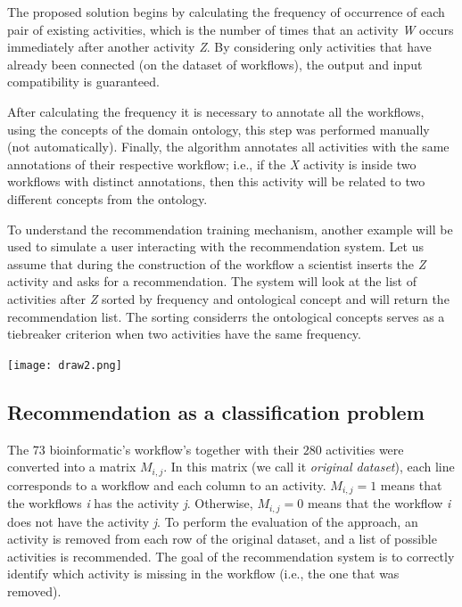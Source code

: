 \documentclass[40pt, a0, portrait]{a0poster}
\begin{document}
\begin{multicols}{2}
The proposed solution begins by calculating the frequency of occurrence of each pair of existing activities, which is the number of times that an activity \emph{W} occurs immediately after another activity \emph{Z}. By considering only activities that have already been connected (on the dataset of workflows), the output and input compatibility is guaranteed.

After calculating the frequency it is necessary to annotate all the workflows, using the concepts of the domain ontology, this step was performed manually (not automatically). Finally, the algorithm annotates all activities with the same annotations of their respective workflow; i.e., if the \emph{X} activity is inside two workflows with distinct annotations, then this activity will be related to two different concepts from the ontology. 

To understand the recommendation training mechanism, another example will be used to simulate a user interacting with the recommendation system. Let us assume that during the construction of the workflow a scientist inserts the \emph{Z} activity and asks for a recommendation. The system will look at the list of activities after \emph{Z} sorted by frequency and ontological concept and will return the recommendation list. The sorting considerrs the ontological concepts serves as a tiebreaker criterion when two activities have the same frequency.

\begin{center}
\texttt{[image: draw2.png]}
\end{center}

\subsection*{Recommendation as a classification problem}
The 73 bioinformatic's workflow's together with their $280$ activities were converted into a matrix $M_{i, j}$. In this matrix (we call it \emph{original dataset}), each line corresponds to a workflow and each column to an activity. $M_{i, j} = 1$ means that the workflows \emph{i} has the activity \emph{j}. Otherwise, $M_{i, j} = 0$ means that the workflow \emph{i} does not have the activity \emph{j}. To perform the evaluation of the approach, an activity is removed from each row of the original dataset, and a list of possible activities is recommended. The goal of the recommendation system is to correctly identify which activity is missing in the workflow (i.e., the one that was removed).


\end{multicols}
\end{document}
